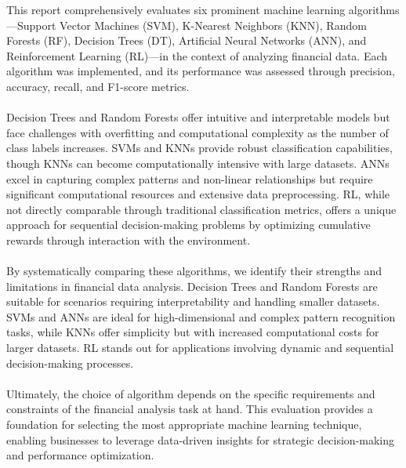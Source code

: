 \documentclass[12pt,a4paper]{report}
\begin{document}
This report comprehensively evaluates six prominent machine learning algorithms—Support Vector Machines (SVM), K-Nearest Neighbors (KNN), Random Forests (RF), Decision Trees (DT), Artificial Neural Networks (ANN), and Reinforcement Learning (RL)—in the context of analyzing financial data. Each algorithm was implemented, and its performance was assessed through precision, accuracy, recall, and F1-score metrics.
\\ \\
Decision Trees and Random Forests offer intuitive and interpretable models but face challenges with overfitting and computational complexity as the number of class labels increases. SVMs and KNNs provide robust classification capabilities, though KNNs can become computationally intensive with large datasets. ANNs excel in capturing complex patterns and non-linear relationships but require significant computational resources and extensive data preprocessing. RL, while not directly comparable through traditional classification metrics, offers a unique approach for sequential decision-making problems by optimizing cumulative rewards through interaction with the environment.
\\ \\
By systematically comparing these algorithms, we identify their strengths and limitations in financial data analysis. Decision Trees and Random Forests are suitable for scenarios requiring interpretability and handling smaller datasets. SVMs and ANNs are ideal for high-dimensional and complex pattern recognition tasks, while KNNs offer simplicity but with increased computational costs for larger datasets. RL stands out for applications involving dynamic and sequential decision-making processes.
\\ \\
Ultimately, the choice of algorithm depends on the specific requirements and constraints of the financial analysis task at hand. This evaluation provides a foundation for selecting the most appropriate machine learning technique, enabling businesses to leverage data-driven insights for strategic decision-making and performance optimization.




\addcon
\end{document}
